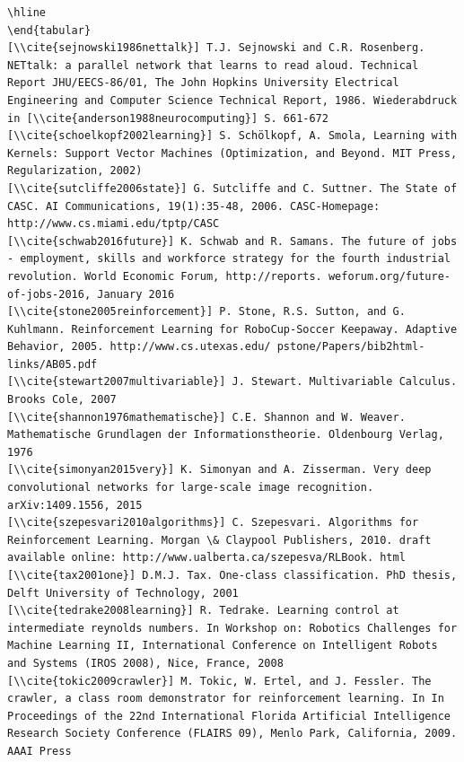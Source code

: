 \documentclass[10pt]{book}
\begin{document}
\begin{verbatim}
\hline
\end{tabular}
[\\cite{sejnowski1986nettalk}] T.J. Sejnowski and C.R. Rosenberg. NETtalk: a parallel network that learns to read aloud. Technical Report JHU/EECS-86/01, The John Hopkins University Electrical Engineering and Computer Science Technical Report, 1986. Wiederabdruck in [\\cite{anderson1988neurocomputing}] S. 661-672
[\\cite{schoelkopf2002learning}] S. Schölkopf, A. Smola, Learning with Kernels: Support Vector Machines (Optimization, and Beyond. MIT Press, Regularization, 2002)
[\\cite{sutcliffe2006state}] G. Sutcliffe and C. Suttner. The State of CASC. AI Communications, 19(1):35-48, 2006. CASC-Homepage: http://www.cs.miami.edu/tptp/CASC
[\\cite{schwab2016future}] K. Schwab and R. Samans. The future of jobs - employment, skills and workforce strategy for the fourth industrial revolution. World Economic Forum, http://reports. weforum.org/future-of-jobs-2016, January 2016
[\\cite{stone2005reinforcement}] P. Stone, R.S. Sutton, and G. Kuhlmann. Reinforcement Learning for RoboCup-Soccer Keepaway. Adaptive Behavior, 2005. http://www.cs.utexas.edu/ pstone/Papers/bib2html-links/AB05.pdf
[\\cite{stewart2007multivariable}] J. Stewart. Multivariable Calculus. Brooks Cole, 2007
[\\cite{shannon1976mathematische}] C.E. Shannon and W. Weaver. Mathematische Grundlagen der Informationstheorie. Oldenbourg Verlag, 1976
[\\cite{simonyan2015very}] K. Simonyan and A. Zisserman. Very deep convolutional networks for large-scale image recognition. arXiv:1409.1556, 2015
[\\cite{szepesvari2010algorithms}] C. Szepesvari. Algorithms for Reinforcement Learning. Morgan \& Claypool Publishers, 2010. draft available online: http://www.ualberta.ca/szepesva/RLBook. html
[\\cite{tax2001one}] D.M.J. Tax. One-class classification. PhD thesis, Delft University of Technology, 2001
[\\cite{tedrake2008learning}] R. Tedrake. Learning control at intermediate reynolds numbers. In Workshop on: Robotics Challenges for Machine Learning II, International Conference on Intelligent Robots and Systems (IROS 2008), Nice, France, 2008
[\\cite{tokic2009crawler}] M. Tokic, W. Ertel, and J. Fessler. The crawler, a class room demonstrator for reinforcement learning. In In Proceedings of the 22nd International Florida Artificial Intelligence Research Society Conference (FLAIRS 09), Menlo Park, California, 2009. AAAI Press

\end{verbatim}
\end{document}

